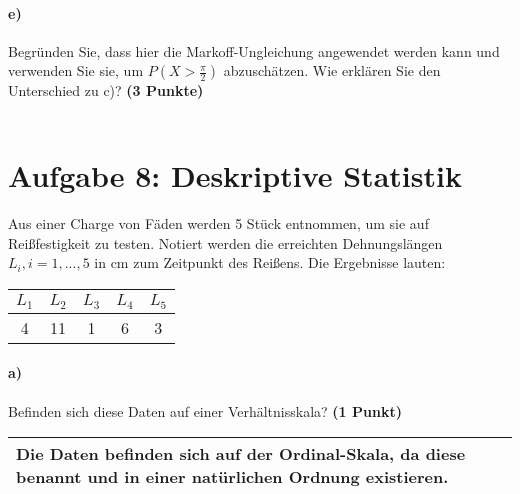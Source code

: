 \documentclass[10pt, a4paper]{article}
\begin{document}
\paragraph{e)} Begründen Sie, dass hier die Markoff-Ungleichung angewendet werden kann und verwenden Sie sie, um $P(X >\frac{\pi}{2})$ abzuschätzen. Wie erklären Sie den Unterschied zu c)? \textbf{(3 Punkte)}\\
\begin{tabular}{| p{17cm} |}
    \hline
    \\\hline
\end{tabular}

\section{Aufgabe 8: Deskriptive Statistik}
Aus einer Charge von Fäden werden 5 Stück entnommen, um sie auf Reißfestigkeit zu testen. Notiert werden die erreichten Dehnungslängen $L_i,i= 1,...,5$ in cm zum Zeitpunkt des Reißens. Die Ergebnisse lauten:
\begin{center}
    \begin{tabular}{c | c | c | c | c}
        $L_1$ & $L_2$ & $L_3$ & $L_4$ & $L_5$ \\\hline
        4     & 11    & 1     & 6     & 3
    \end{tabular}
\end{center}

\paragraph{a)} Befinden sich diese Daten auf einer Verhältnisskala? \textbf{(1 Punkt)}\\
\begin{tabular}{| p{17cm} |}
    \hline
    Die Daten befinden sich auf der Ordinal-Skala, da diese benannt und in einer natürlichen Ordnung existieren.
    \\\hline
\end{tabular}
\end{document}
